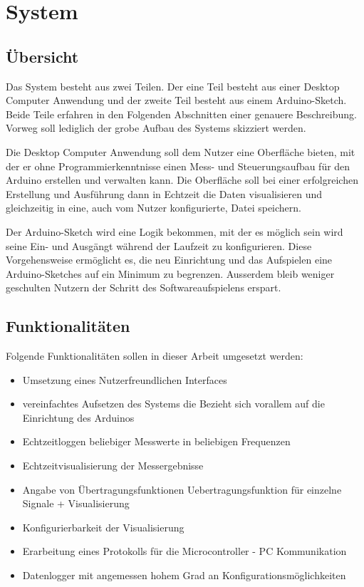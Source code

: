 \chapter{System}
\section{Übersicht}
Das System besteht aus zwei Teilen. Der eine Teil besteht aus einer Desktop Computer Anwendung und der zweite Teil besteht aus einem Arduino-Sketch.
Beide Teile erfahren in den Folgenden Abschnitten einer genauere Beschreibung. Vorweg soll lediglich der grobe Aufbau des Systems skizziert werden.

Die Desktop Computer Anwendung soll dem Nutzer eine Oberfläche bieten, mit der er ohne Programmierkenntnisse einen Mess- und Steuerungsaufbau für den Arduino erstellen und verwalten kann. Die Oberfläche soll bei einer erfolgreichen Erstellung und Ausführung dann in Echtzeit die Daten visualisieren und gleichzeitig in eine, auch vom Nutzer konfigurierte, Datei speichern.

Der Arduino-Sketch wird eine Logik bekommen, mit der es möglich sein wird seine Ein- und Ausgängt während der Laufzeit zu konfigurieren. Diese Vorgehensweise ermöglicht es, die neu Einrichtung und das Aufspielen eine Arduino-Sketches auf ein Minimum zu begrenzen. Ausserdem bleib weniger geschulten Nutzern der Schritt des Softwareaufspielens erspart.


\section{Funktionalitäten}
Folgende Funktionalitäten sollen in dieser Arbeit umgesetzt werden:
\begin{itemize}
 \item Umsetzung eines Nutzerfreundlichen Interfaces
 \item vereinfachtes Aufsetzen des Systems
 \subitem die Bezieht sich vorallem auf die Einrichtung des Arduinos
 \item Echtzeitloggen beliebiger Messwerte in beliebigen Frequenzen
 \item Echtzeitvisualisierung der Messergebnisse
 \item Angabe von Übertragungsfunktionen \gls{Uebertragungsfunktion} für einzelne Signale + Visualisierung
 \item Konfigurierbarkeit der Visualisierung
 \item Erarbeitung eines Protokolls für die Microcontroller - PC Kommunikation
 \item Datenlogger mit angemessen hohem Grad an Konfigurationsmöglichkeiten
\end{itemize}

